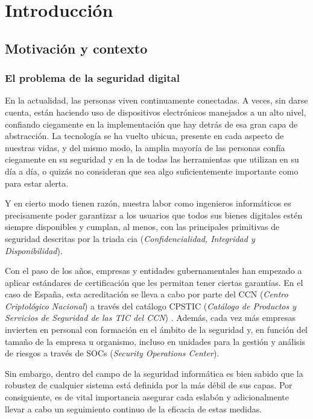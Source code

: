\chapter{Introducción}




\section{Motivación y contexto}

\subsection{El problema de la seguridad digital}

En la actualidad, las personas viven continuamente conectadas. A veces, sin darse cuenta, están haciendo uso de dispositivos electrónicos manejados a un alto nivel, confiando ciegamente en la implementación que hay detrás de esa gran capa de abstracción. La tecnología se ha vuelto ubicua, presente en cada aspecto de nuestras vidas, y del mismo modo, la amplia mayoría de las personas confía ciegamente en su seguridad y en la de todas las herramientas que utilizan en su día a día, o quizás no consideran que sea algo suficientemente importante como para estar alerta. 

Y en cierto modo tienen razón, nuestra labor como ingenieros informáticos es precisamente poder garantizar a los usuarios que todos sus bienes digitales estén siempre disponibles y cumplan, al menos, con las principales primitivas de seguridad descritas por la triada \gls{cia} (\textit{Confidencialidad, Integridad y Disponibilidad}).

Con el paso de los años, empresas y entidades gubernamentales han empezado a aplicar estándares de certificación que les permitan tener ciertas garantías. En el caso de España, esta acreditación se lleva a cabo por parte del \gls{CCN} (\textit{Centro Criptológico Nacional}) \cite{ccn-main} a través del catálogo \gls{CPSTIC} (\textit{Catálogo de Productos y Servicios de Seguridad de las TIC del CCN}) \cite{ccn-cpstic}. Además, cada vez más empresas invierten en personal con formación en el ámbito de la seguridad y, en función del tamaño de la empresa u organismo, incluso en unidades para la gestión y análisis de riesgos a través de \gls{SOC}s (\textit{Security Operations Center}).

Sin embargo, dentro del campo de la seguridad informática es bien sabido que la robustez de cualquier sistema está definida por la más débil de sus capas. Por consiguiente, es de vital importancia asegurar cada eslabón y adicionalmente llevar a cabo un seguimiento continuo de la eficacia de estas medidas. 

